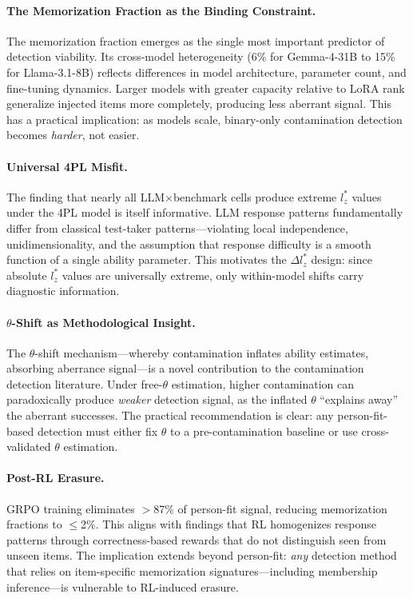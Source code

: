 \documentclass[11pt]{article}
\begin{document}
\paragraph{The Memorization Fraction as the Binding Constraint.} The memorization fraction emerges as the single most important predictor of detection viability. Its cross-model heterogeneity (6\% for Gemma-4-31B to 15\% for Llama-3.1-8B) reflects differences in model architecture, parameter count, and fine-tuning dynamics. Larger models with greater capacity relative to LoRA rank generalize injected items more completely, producing less aberrant signal. This has a practical implication: as models scale, binary-only contamination detection becomes \emph{harder}, not easier.

\paragraph{Universal 4PL Misfit.} The finding that nearly all LLM$\times$benchmark cells produce extreme $l_z^*$ values under the 4PL model is itself informative. LLM response patterns fundamentally differ from classical test-taker patterns---violating local independence, unidimensionality, and the assumption that response difficulty is a smooth function of a single ability parameter. This motivates the $\Delta l_z^*$ design: since absolute $l_z^*$ values are universally extreme, only within-model shifts carry diagnostic information.

\paragraph{$\theta$-Shift as Methodological Insight.} The $\theta$-shift mechanism---whereby contamination inflates ability estimates, absorbing aberrance signal---is a novel contribution to the contamination detection literature. Under free-$\theta$ estimation, higher contamination can paradoxically produce \emph{weaker} detection signal, as the inflated $\theta$ ``explains away'' the aberrant successes. The practical recommendation is clear: any person-fit-based detection must either fix $\theta$ to a pre-contamination baseline or use cross-validated $\theta$ estimation.

\paragraph{Post-RL Erasure.} GRPO training eliminates $>$87\% of person-fit signal, reducing memorization fractions to $\leq$2\%. This aligns with findings that RL homogenizes response patterns through correctness-based rewards that do not distinguish seen from unseen items. The implication extends beyond person-fit: \emph{any} detection method that relies on item-specific memorization signatures---including membership inference---is vulnerable to RL-induced erasure.
\end{document}
